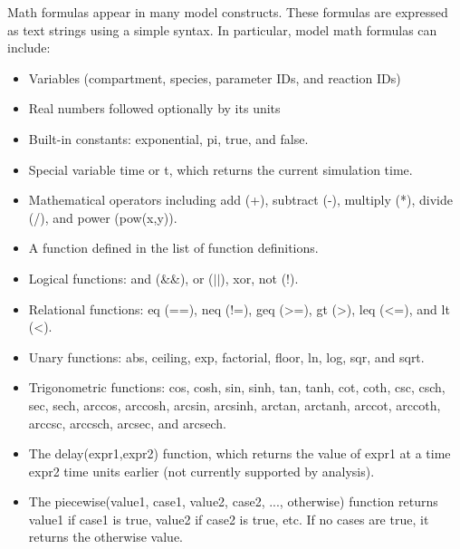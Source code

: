 \documentclass[titlepage,11pt]{article}
\begin{document}
\noindent
Math formulas appear in many model constructs.  These formulas are expressed as text strings using a simple syntax.  In particular, model math formulas can include: 
\begin{itemize}
\item Variables (compartment, species, parameter IDs, and reaction IDs)
\item Real numbers followed optionally by its units
\item Built-in constants: exponential, pi, true, and false.
\item Special variable time or t, which returns the current simulation time.
\item Mathematical operators including add (+), subtract (-), multiply (*), divide (/), and power (pow(x,y)).
\item A function defined in the list of function definitions.
\item Logical functions: and (\&\&), or ($||$), xor, not (!).
\item Relational functions: eq (==), neq (!=), geq (>=), gt (>), leq (<=), and lt (<).
\item Unary functions: abs, ceiling, exp, factorial, floor, ln, log, sqr, and sqrt.
\item Trigonometric functions: cos, cosh, sin, sinh, tan, tanh, cot, coth, csc, csch, sec, sech, arccos, arccosh, arcsin, arcsinh, arctan, arctanh, arccot, arccoth, arccsc, arccsch, arcsec, and arcsech.
\item The delay(expr1,expr2) function, which returns the value of expr1 at a time expr2 time units earlier (not currently supported by analysis).
\item The piecewise(value1, case1, value2, case2, ..., otherwise) function returns value1 if case1 is true, value2 if case2 is true, etc.  If no cases are true, it returns the otherwise value.
\end{itemize}
\end{document}

